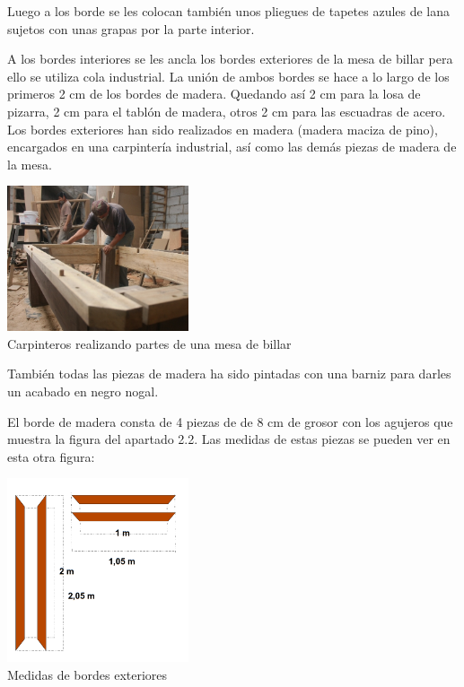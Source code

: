 Luego a los borde se les colocan también unos pliegues de tapetes azules de lana sujetos con unas grapas por la parte interior.


A los bordes interiores se les ancla los bordes exteriores de la mesa de billar pera ello se utiliza cola industrial. La unión de ambos bordes se hace a lo largo de los primeros 2 cm de los bordes de madera. Quedando así 2 cm para la losa de pizarra,  2 cm para el tablón de madera, otros 2 cm para las escuadras de acero. Los bordes exteriores han sido realizados en madera (madera maciza de pino), encargados en una carpintería industrial, así como las demás piezas de  madera de la mesa.  

\begin{center}
    		\includegraphics[width=0.4\textwidth]{fc742624-a4ab-44cb-beef-0393ab3abd4a.jpg}
	          \\ \small {Carpinteros realizando partes de una mesa de billar}
	\end{center}



También todas las piezas de madera ha sido pintadas con una barniz para darles un acabado en negro nogal.

El borde de madera consta de 4 piezas de de 8 cm de grosor con los agujeros que muestra la figura del apartado 2.2.  Las medidas de estas piezas se pueden ver en esta otra figura:

\begin{center}
    		\includegraphics[width=0.4\textwidth]{Exterior.png}
		 \\ \small {Medidas de bordes exteriores}
	\end{center}

